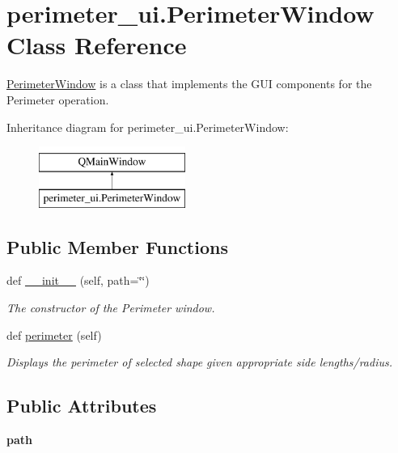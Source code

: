 \hypertarget{classperimeter__ui_1_1_perimeter_window}{}\section{perimeter\+\_\+ui.\+Perimeter\+Window Class Reference}
\label{classperimeter__ui_1_1_perimeter_window}


\hyperlink{classperimeter__ui_1_1_perimeter_window}{Perimeter\+Window} is a class that implements the G\+UI components for the Perimeter operation.  


Inheritance diagram for perimeter\+\_\+ui.\+Perimeter\+Window\+:\begin{figure}[H]
\begin{center}
\leavevmode
\includegraphics[height=2.000000cm]{classperimeter__ui_1_1_perimeter_window}
\end{center}
\end{figure}
\subsection*{Public Member Functions}
\begin{DoxyCompactItemize}
\item 
def \hyperlink{classperimeter__ui_1_1_perimeter_window_aa763b2caa5f3425d4666e237a58c1dc3}{\+\_\+\+\_\+init\+\_\+\+\_\+} (self, path=\char`\"{}\char`\"{})
\begin{DoxyCompactList}\small\item\em The constructor of the Perimeter window. \end{DoxyCompactList}\item 
def \hyperlink{classperimeter__ui_1_1_perimeter_window_afdeb1c9d24171741ae3077eaa4e2070d}{perimeter} (self)
\begin{DoxyCompactList}\small\item\em Displays the perimeter of selected shape given appropriate side lengths/radius. \end{DoxyCompactList}\end{DoxyCompactItemize}
\subsection*{Public Attributes}
\begin{DoxyCompactItemize}
\item 
\mbox{\label{classperimeter__ui_1_1_perimeter_window_aa5f7496d431ceed317466669c3051272}} 
{\bfseries path}
\end{DoxyCompactItemize}


